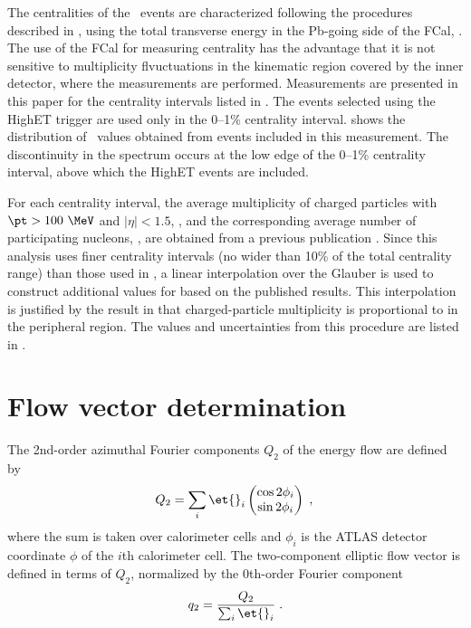 The centralities of the \pPb\ events are characterized following the procedures described in , using the total transverse energy in the Pb-going side of the \ac{FCal}, \sumETPb.
The use of the \ac{FCal} for measuring centrality has the advantage that it is not sensitive to multiplicity flvuctuations in the kinematic region covered by the inner detector, where the measurements are performed.
Measurements are presented in this paper for the centrality intervals listed in .
The events selected using the \ac{HighET} trigger are used only in the 0--1\% centrality interval.
 shows the distribution of \sumETPb\ values obtained from events included in this
measurement.
The discontinuity in the spectrum occurs at the low edge of the 0--1\% centrality interval, above which the \ac{HighET} events are included.

For each centrality interval, the average multiplicity of charged particles with $\pt > 100~\MeV$ and $|\eta| < 1.5$, \avgdNdeta, and the corresponding average number of participating nucleons, \avgNpart, are obtained from a previous publication \cite{HION-2012-15}.
Since this analysis uses finer centrality intervals (no wider than 10\% of the total centrality range) than
those used in , a linear interpolation over the Glauber \avgNpart is used to construct additional values for \avgdNdeta based on the published results.
This interpolation is justified by the result in  that charged-particle multiplicity is proportional to \avgNpart in the peripheral region.
The values and uncertainties from this procedure are listed in .

 

\section{Flow vector determination}

The 2nd-order azimuthal Fourier components $Q_2$ of the energy flow are defined by
\begin{equation}
  Q_2 = \sum_{i}  \et{}_i \begin{pmatrix} \cos 2\phi_i \\ \sin 2\phi_i \end{pmatrix} \; ,\\
\end{equation}
where the sum is taken over calorimeter cells and $\phi_i$ is the ATLAS detector coordinate $\phi$ of the $i$th calorimeter cell.
The two-component elliptic flow vector \qt is defined in terms of $Q_2$, normalized by the 0th-order Fourier component
\begin{equation}
  \qt = \frac{Q_2}{\sum_i \et{}_i } \; .\\
\end{equation}

